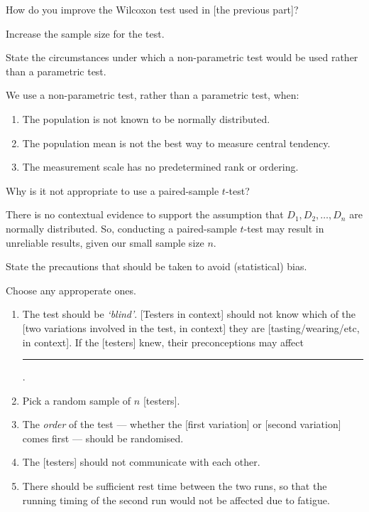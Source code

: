 \documentclass[../Notes.tex]{subfiles}
\begin{document}
\begin{note}
  How do you improve the Wilcoxon test used in [the previous part]?
  \begin{center}
    Increase the sample size for the test.
  \end{center}
\end{note}
\begin{note}
  State the circumstances under which a non-parametric test would be used rather than a parametric test.
  \begin{center}
    \parbox{0.9\textwidth}{
      We use a non-parametric test, rather than a parametric test, when:
      \begin{enumerate}
        \item The population is not known to be normally distributed.
        \item The population mean is not the best way to measure central tendency.
        \item The measurement scale has no predetermined rank or ordering. 
      \end{enumerate}
    }
  \end{center}
\end{note}
\begin{note}
  \hypertarget{wilcoxon>t}{}
  Why is it not appropriate to use a paired-sample \(t\)-test? 
  \begin{center}
    \parbox{0.9\textwidth}{
      There is no contextual evidence to support the assumption that \(D_1,D_2,\dots,D_n\) are normally distributed. So, conducting a paired-sample \(t\)-test may result in unreliable results, given our small sample size \(n\). 
    }
  \end{center}
\end{note}
\begin{note}
  State the precautions that should be taken to avoid (statistical) bias. 
  \begin{center}
    \parbox{0.9\textwidth}{
      Choose any approperate ones.
      \begin{enumerate}
        \item The test should be \emph{`blind'}. [Testers in context] should not know which of the [two variations involved in the test, in context] they are [tasting/wearing/etc, in context]. If the [testers] knew, their preconceptions may affect \rule{2cm}{0.01mm}.
        \item Pick a random sample of \(n\) [testers].
        \item The \emph{order} of the test --- whether the [first variation] or [second variation] comes first --- should be randomised.
        \item The [testers] should not communicate with each other.
        \item There should be sufficient rest time between the two runs, so that the running timing of the second run would not be affected due to fatigue.
      \end{enumerate}
    }
  \end{center}
\end{note}
\end{document}
